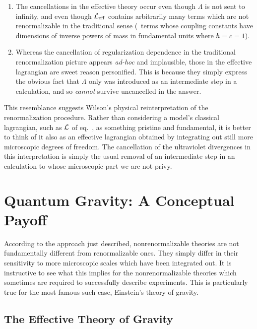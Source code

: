 \begin{enumerate}
\item
The cancellations in the effective theory occur even though
$\Lambda$ is not sent to infinity, and even though 
${\cal L}_{\rm eff}$ contains arbitrarily many terms which
are not renormalizable in the traditional sense (\ie\ terms
whose coupling constants have dimensions of inverse powers
of mass in fundamental units where $\hbar =  c = 1$). 
%
\item
Whereas the cancellation of regularization dependence
in the traditional renormalization picture appears {\it ad-hoc}
and implausible, those in the effective lagrangian are sweet
reason personified. This is because they simply
express the obvious fact that $\Lambda$ only was introduced
as an intermediate step in a calculation, and so {\sl cannot}
survive uncancelled in the answer. 
\end{enumerate}

This resemblance suggests Wilson's physical reinterpretation of
the renormalization procedure. Rather than considering a model's
classical lagrangian, such as ${\cal L}$ of eq.~, 
as something pristine and fundamental, it is
better to think of it also as an effective lagrangian obtained
by integrating out still more microscopic degrees of freedom. 
The cancellation of the ultraviolet divergences in this interpretation
is simply the usual removal of an intermediate step in an
calculation to whose microscopic part we are not privy.

\section{Quantum Gravity: A Conceptual Payoff}

According to the approach just described, nonrenormalizable
theories are not fundamentally different from renormalizable
ones. They simply differ in their sensitivity to more microscopic
scales which have been integrated out. It is instructive to 
see what this implies for the nonrenormalizable theories which
sometimes are required to successfully describe experiments.
This is particularly true for the most famous such case, 
Einstein's theory of gravity. 

\subsection{The Effective Theory of Gravity}

